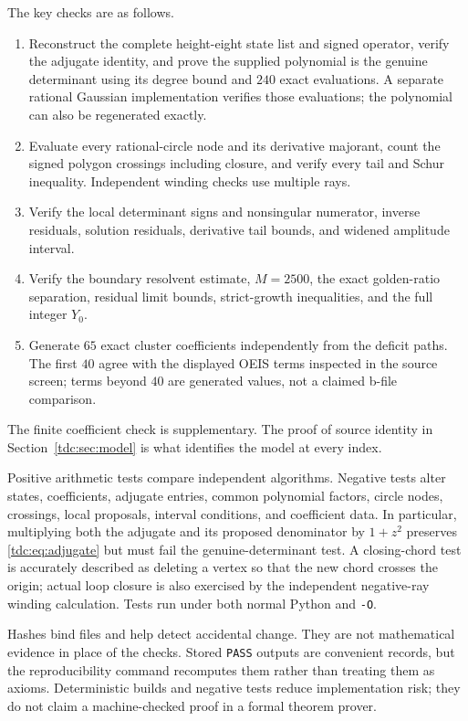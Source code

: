 \documentclass[11pt]{article}
\theoremstyle{definition}\newtheorem{definition}[theorem]{Definition}
\theoremstyle{remark}\newtheorem{remark}[theorem]{Remark}
\begin{document}
The key checks are as follows.
\begin{enumerate}
\item Reconstruct the complete height-eight state list and signed operator, verify the adjugate identity, and prove the supplied polynomial is the genuine determinant using its degree bound and $240$ exact evaluations. A separate rational Gaussian implementation verifies those evaluations; the polynomial can also be regenerated exactly.
\item Evaluate every rational-circle node and its derivative majorant, count the signed polygon crossings including closure, and verify every tail and Schur inequality. Independent winding checks use multiple rays.
\item Verify the local determinant signs and nonsingular numerator, inverse residuals, solution residuals, derivative tail bounds, and widened amplitude interval.
\item Verify the boundary resolvent estimate, $M=2500$, the exact golden-ratio separation, residual limit bounds, strict-growth inequalities, and the full integer $Y_0$.
\item Generate $65$ exact cluster coefficients independently from the deficit paths. The first $40$ agree with the displayed OEIS terms inspected in the source screen; terms beyond $40$ are generated values, not a claimed b-file comparison.
\end{enumerate}
The finite coefficient check is supplementary. The proof of source identity in Section~\ref{tdc:sec:model} is what identifies the model at every index.

Positive arithmetic tests compare independent algorithms. Negative tests alter states, coefficients, adjugate entries, common polynomial factors, circle nodes, crossings, local proposals, interval conditions, and coefficient data. In particular, multiplying both the adjugate and its proposed denominator by $1+z^2$ preserves \eqref{tdc:eq:adjugate} but must fail the genuine-determinant test. A closing-chord test is accurately described as deleting a vertex so that the new chord crosses the origin; actual loop closure is also exercised by the independent negative-ray winding calculation. Tests run under both normal Python and \texttt{-O}.

Hashes bind files and help detect accidental change. They are not mathematical evidence in place of the checks. Stored \texttt{PASS} outputs are convenient records, but the reproducibility command recomputes them rather than treating them as axioms. Deterministic builds and negative tests reduce implementation risk; they do not claim a machine-checked proof in a formal theorem prover.
\end{document}
